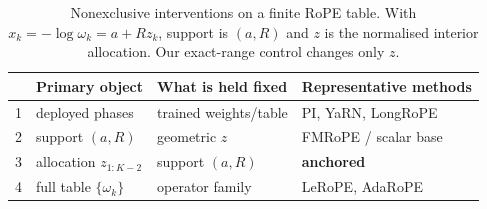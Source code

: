 \begin{table}[tb]
\centering
\small
\setlength{\tabcolsep}{3pt}
\renewcommand{\arraystretch}{0.95}
\caption{Nonexclusive interventions on a finite RoPE table. With
$x_k=-\log\omega_k=a+Rz_k$, support is $(a,R)$ and $z$ is the normalised
interior allocation. Our exact-range control changes only $z$.}
\label{tab:layers}
\begin{tabular}{@{}clll@{}}
\toprule
 & Primary object & What is held fixed & Representative methods \\
\midrule
1 & deployed phases & trained weights/table & PI, YaRN, LongRoPE \\
2 & support $(a,R)$ & geometric $z$ & FMRoPE / scalar base \\
3 & allocation $z_{1:K-2}$ & support $(a,R)$ & \textbf{anchored \evq{}} \\
4 & full table $\{\omega_k\}$ & operator family & LeRoPE, AdaRoPE \\
\bottomrule
\end{tabular}
\end{table}
